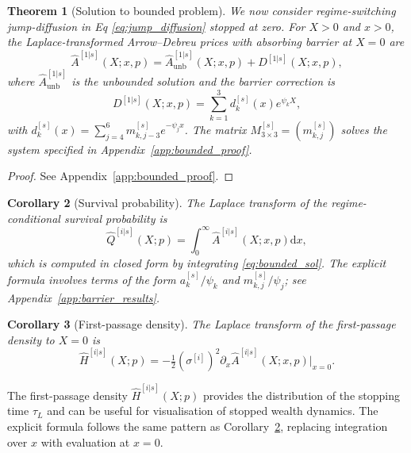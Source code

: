 \documentclass[11pt,a4paper]{article}
\numberwithin{equation}{section}
\newtheorem{theorem}{Theorem}[section]
\newtheorem{corollary}[theorem]{Corollary}
\newcommand{\dd}{\mathrm{d}}
\begin{document}
\begin{theorem}[Solution to bounded problem]\label{thm:bounded_solution}
We now consider regime-switching jump-diffusion in Eq \eqref{eq:jump_diffusion} stopped at zero. For $X > 0$ and $x > 0$, the Laplace-transformed Arrow--Debreu prices with absorbing barrier at $X = 0$ are
\begin{equation}\label{eq:bounded_sol}
\hat{A}^{[1|s]}(X; x, p) = \hat{A}^{[1|s]}_{\mathrm{unb}}(X; x, p) + D^{[1|s]}(X; x, p),
\end{equation}
where $\hat{A}^{[1|s]}_{\mathrm{unb}}$ is the unbounded solution and the barrier correction is
\begin{equation}\label{eq:barrier_correction}
D^{[1|s]}(X; x, p) = \sum_{k=1}^{3} d^{[s]}_k(x) e^{\psi_k X},
\end{equation}
with $d^{[s]}_k(x) = \sum_{j=4}^{6} m^{[s]}_{k,j-3} e^{-\psi_j x}$. The matrix $M^{[s]}_{3 \times 3} = (m^{[s]}_{k,j})$ solves the system specified in Appendix~\ref{app:bounded_proof}.
\end{theorem}

\begin{proof}
See Appendix~\ref{app:bounded_proof}.
\end{proof}


\begin{corollary}[Survival probability]\label{cor:survival}
The Laplace transform of the regime-conditional survival probability is
\begin{equation}\label{eq:survival_laplace}
\hat{Q}^{[i|s]}(X; p) = \int_0^\infty \hat{A}^{[i|s]}(X; x, p) \dd x,
\end{equation}
which is computed in closed form by integrating \eqref{eq:bounded_sol}. The explicit formula involves terms of the form $a^{[s]}_k / \psi_k$ and $m^{[s]}_{k,j} / \psi_j$; see Appendix~\ref{app:barrier_results}.
\end{corollary}

\begin{corollary}[First-passage density]\label{cor:hitting}
The Laplace transform of the first-passage density to $X = 0$ is
\begin{equation}\label{eq:hitting_laplace}
\hat{H}^{[i|s]}(X; p) = -\tfrac{1}{2}(\sigma^{[i]})^2 \partial_x \hat{A}^{[i|s]}(X; x, p)\big|_{x=0}.
\end{equation}
\end{corollary}
The first-passage density $\hat{H}^{[i|s]}(X; p)$ provides the distribution of the stopping time $\tau_L$ and can be useful for visualisation of stopped wealth dynamics. The explicit formula follows the same pattern as Corollary~\ref{cor:survival}, 
replacing integration over $x$ with evaluation at $x=0$.
\end{document}
